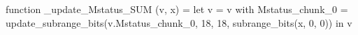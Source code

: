 function _update_Mstatus_SUM (v, x) = let v = { v with Mstatus_chunk_0 = update_subrange_bits(v.Mstatus_chunk_0, 18, 18, subrange_bits(x, 0, 0)) } in
  v

